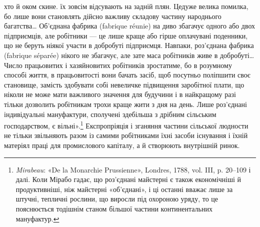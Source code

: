 хто й оком скине. їх зовсім відсувають на задній плян. Цедуже
велика помилка, бо лише вони становлять дійсно важливу складову
частину народнього багатства\dots{} Об’єднана фабрика (fabrique
réunie) на диво збагачує одного або двох підприємців, але
робітники — це лише краще або гірше оплачувані поденники,
що не беруть ніякої участи в добробуті підприємця. Навпаки,
роз’єднана фабрика (fabrique séparée) нікого не збагачує, але
зате маса робітників живе в добробуті\dots{} Число працьовитих і
хазяйновитих робітників зростатиме, бо в розумному способі
життя, в працьовитості вони бачать засіб, щоб посутньо поліпшити
своє становище, замість здобувати собі невеличке підвищення
заробітної плати, що ніколи не може мати важливого
значення для будучини і в найкращому разі тільки дозволить
робітникам трохи краще жити з дня на день. Лише роз’єднані
індивідуальні мануфактури, сполучені здебільша з дрібним сільським
господарством, є вільні».\footnote{
\emph{Mirabeau}: «De la Monarchie Prussienne», Londres, 1788, vol. III,
p. 20--109 і далі. Коли Мірабо гадає, що роз’єднані майстерні є
також економічніші й продуктивніші, ніж майстерні «об’єднані», і ці
останні вважає лише за штучні, тепличні рослини, що виросли під охороною
уряду, то це пояснюється тодішнім станом більшої частини континентальних
мануфактур.
} Експропріяція і зганяння
частини сільської людности не тільки звільняють разом із самими
робітниками їхні засоби існування і їхній матеріял праці для
промислового капіталу, а й створюють внутрішній ринок.

